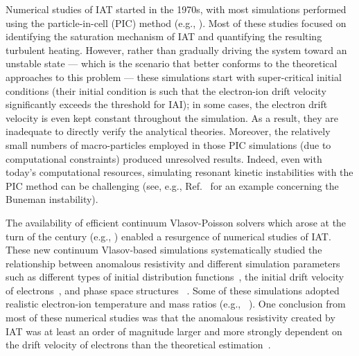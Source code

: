 \documentclass[%
 reprint,
 amsmath,
 amssymb,
 aps,
 prx,
floatfix,
superscriptaddress
]{revtex4-2}
\begin{document}
Numerical studies of IAT started in the 1970s, with most simulations performed using the particle-in-cell (PIC) method (e.g., \cite{biskamp1971computer,biskamp1972computer,boris1970computations,ishihara1981quasilinear,ishihara1983quasilinear,dum1979anomalous,degroot1977localized}).
Most of these studies focused on identifying the saturation mechanism of IAT and quantifying the resulting turbulent heating.
However, rather than gradually driving the system toward an unstable state --- which is the scenario that better conforms to the theoretical approaches to this problem --- these simulations start with super-critical initial conditions (their initial condition is such that the electron-ion drift velocity significantly exceeds the threshold for IAI); in some cases, 
the electron drift velocity is even kept constant throughout the simulation.
As a result, they are inadequate to directly verify the analytical theories.
Moreover, the relatively small numbers of macro-particles employed in those PIC simulations (due to computational constraints) produced unresolved results. 
Indeed, even with today's computational resources, simulating resonant kinetic instabilities with the PIC method can be challenging (see, e.g., Ref.~\cite{tavassoli2021role} for an example concerning the Buneman instability). 

The availability of efficient continuum Vlasov-Poisson solvers which arose at the turn of the century (e.g., \cite{fijalkow1999numerical,horne2001new}) enabled a resurgence of numerical studies of IAT.
These new continuum Vlasov-based simulations systematically studied the relationship between anomalous resistivity and different simulation parameters such as different types of initial distribution functions~\cite{watt2002ion, petkaki2003anomalous}, the initial drift velocity of electrons~\cite{petkaki2008nonlinear}, and phase space structures ~\cite{buchner2006anomalous,lesur2014nonlinear}. 
Some of these simulations adopted realistic electron-ion temperature and mass ratios (e.g., ~\cite{petkaki2006anomalous,hellinger2004effective}). 
One conclusion from most of these numerical studies was that the anomalous resistivity created by IAT was at least an order of magnitude larger and more strongly dependent on the drift velocity of electrons than the theoretical estimation~\cite{galeev1984current}. 
\end{document}
